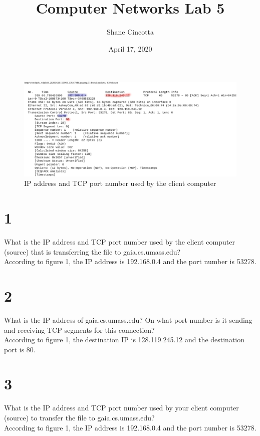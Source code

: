 \documentclass{article}
\title{Computer Networks Lab 5}
\author{Shane Cincotta }
\date{April 17, 2020}
\begin{document}
\maketitle

\begin{figure}[h!]
\centering
\includegraphics[scale=0.5]{Q1-3.pdf}
\caption{IP address and TCP port number used by the client computer}
\end{figure}

\section*{1}
What is the IP address and TCP port number used by the client computer (source)
that is transferring the file to gaia.cs.umass.edu?\\
\newline According to figure 1, the IP address is 192.168.0.4 and the port number is 53278.\\

\section*{2}
What is the IP address of gaia.cs.umass.edu? On what port number is it sending
and receiving TCP segments for this connection?\\
\newline According to figure 1, the destination IP is 128.119.245.12 and the destination port is 80.\\
\section*{3}
What is the IP address and TCP port number used by your client computer
(source) to transfer the file to gaia.cs.umass.edu?\\
\newline According to figure 1, the IP address is 192.168.0.4 and the port number is 53278.\\
\clearpage
\end{document}
